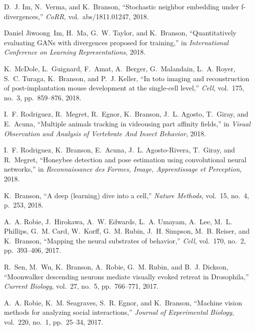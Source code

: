 \begin{cvenum}
\item D.~J. Im, N.~Verma, and K.~Branson, ``Stochastic neighbor embedding under
  f-divergences,'' {\em CoRR}, vol.~abs/1811.01247, 2018.

\item Daniel Jiwoong~Im, H.~Ma, G.~W. Taylor, and K.~Branson,
  ``Quantitatively evaluating {GAN}s with divergences proposed for training,''
  in {\em International Conference on Learning Representations},
  2018.

\item K.~McDole, L.~Guignard, F.~Amat, A.~Berger, G.~Malandain, L.~A. Royer, S.~C.
  Turaga, K.~Branson, and P.~J. Keller, ``In toto imaging and reconstruction of
  post-implantation mouse development at the single-cell level,'' {\em Cell},
  vol.~175, no.~3, pp.~859--876, 2018.

\item I.~F. Rodriguez, R.~Megret, R.~Egnor, K.~Branson, J.~L. Agosto, T.~Giray, and
  E.~Acuna, ``Multiple animals tracking in videousing part affinity fields,''
  in {\em Visual Observation and Analysis of Vertebrate And Insect Behavior},
  2018.

\item I.~F. Rodriguez, K.~Branson, E.~Acuna, J.~L. Agosto-Rivera, T.~Giray, and
  R.~Megret, ``Honeybee detection and pose estimation using convolutional
  neural networks,'' in {\em Reconnaissance des Formes, Image, Apprentissage et
  Perception}, 2018.

\item K.~Branson, ``A deep (learning) dive into a cell,'' {\em Nature Methods},
  vol.~15, no.~4, p.~253, 2018.

\item A.~A. Robie, J.~Hirokawa, A.~W. Edwards, L.~A. Umayam,
  A.~Lee, M.~L. Phillips, G.~M. Card, W.~Korff, G.~M. Rubin, J.~H. Simpson,
  M.~B. Reiser, and K.~Branson, ``Mapping the neural substrates of behavior,''
  {\em Cell}, vol.~170, no.~2, pp.~393--406, 2017.

\item R.~Sen, M.~Wu, K.~Branson, A.~Robie, G.~M. Rubin, and B.~J. Dickson,
  ``Moonwalker descending neurons mediate visually evoked retreat in
  {D}rosophila,'' {\em Current Biology}, vol.~27, no.~5, pp.~766--771, 2017.

\item A.~A. Robie, K.~M. Seagraves, S.~R. Egnor, and K.~Branson, ``Machine vision
  methods for analyzing social interactions,'' {\em Journal of Experimental
  Biology}, vol.~220, no.~1, pp.~25--34, 2017.


\end{cvenum}
